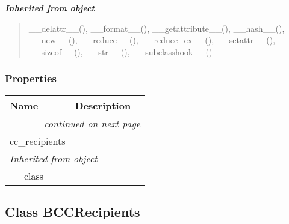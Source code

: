 \large{\textbf{\textit{Inherited from object}}}

\begin{quote}
\_\_delattr\_\_(), \_\_format\_\_(), \_\_getattribute\_\_(), \_\_hash\_\_(), \_\_new\_\_(), \_\_reduce\_\_(), \_\_reduce\_ex\_\_(), \_\_setattr\_\_(), \_\_sizeof\_\_(), \_\_str\_\_(), \_\_subclasshook\_\_()
\end{quote}


  \subsubsection{Properties}

    \vspace{-1cm}
\hspace{\varindent}\begin{longtable}{|p{\varnamewidth}|p{\vardescrwidth}|l}
\cline{1-2}
\cline{1-2} \centering \textbf{Name} & \centering \textbf{Description}& \\
\cline{1-2}
\endhead\cline{1-2}\multicolumn{3}{r}{\small\textit{continued on next page}}\\\endfoot\cline{1-2}
\endlastfoot\raggedright c\-c\-\_\-r\-e\-c\-i\-p\-i\-e\-n\-t\-s\- & &\\
\cline{1-2}
\multicolumn{2}{|l|}{\textit{Inherited from object}}\\
\multicolumn{2}{|p{\varwidth}|}{\raggedright \_\_class\_\_}\\
\cline{1-2}
\end{longtable}



\subsection{Class BCCRecipients}

